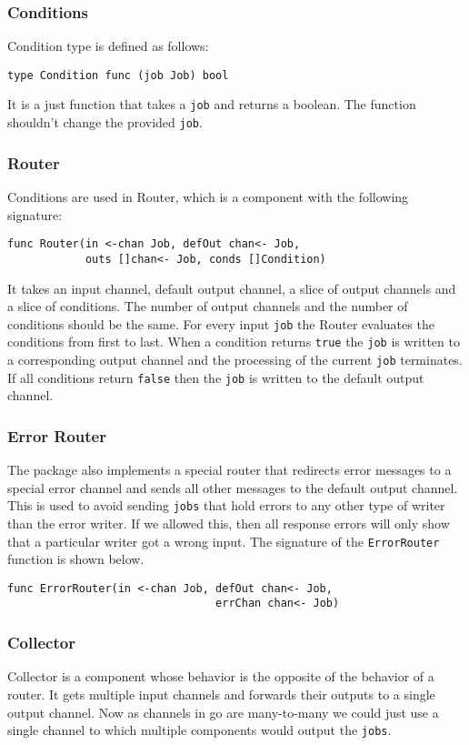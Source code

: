 \subsubsection{Conditions}
Condition type is defined as follows:
\begin{lstlisting}
type Condition func (job Job) bool
\end{lstlisting}
It is a just function that takes a \texttt{job} and returns a boolean.
The function shouldn't change the provided \texttt{job}.

\subsubsection{Router}
Conditions are used in Router, which is a component with the 
following signature:
\begin{lstlisting}
func Router(in <-chan Job, defOut chan<- Job, 
            outs []chan<- Job, conds []Condition)
\end{lstlisting}
It takes an input channel, default output channel, a slice of output channels 
and a slice of conditions.
The number of output channels and the number of conditions should be the same.
For every input \texttt{job} the Router evaluates the conditions from first to last.
When a condition returns \texttt{true} the \texttt{job} is written to a 
corresponding output channel 
and the processing of the current \texttt{job} terminates. If all conditions 
return \texttt{false} then the \texttt{job} is written to the default output channel.

\subsubsection{Error Router}
The package also implements a special router that redirects error messages
to a special error channel and sends all other messages to the default output 
channel. This is used to avoid sending \texttt{jobs} that hold errors to 
any other type of writer than the error writer. If we allowed this, then
all response errors will only show that a particular writer got a wrong input.
The signature of the \texttt{ErrorRouter} function is shown below.
\begin{lstlisting}
func ErrorRouter(in <-chan Job, defOut chan<- Job, 
                                errChan chan<- Job)
\end{lstlisting}

\subsubsection{Collector}
Collector is a component whose behavior is the opposite of the behavior 
of a router. It gets multiple input channels
and forwards their outputs to a single output channel. Now as channels
in go are many-to-many we could just use a single channel to which
multiple components would output the \texttt{jobs}. 

